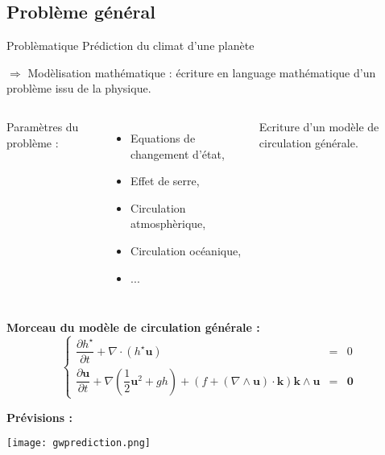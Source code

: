 \documentclass[11pt]{beamer}
\begin{document}
\subsection{Problème général}
\begin{frame}
\begin{block}{Problèmatique}
Prédiction du climat d'une planète

\begin{flushright}
$\Rightarrow$ Modèlisation mathématique : écriture en language mathématique d'un problème issu de la physique.
\end{flushright}

\pause
\end{block}

\vspace{0.8cm}
\begin{columns}
Paramètres du problème :
\begin{itemize}
\item Equations de changement d'état,
\item Effet de serre,
\item Circulation atmosphèrique,
\item Circulation océanique,
\item ...
\end{itemize}

\pause
{}
\begin{block}{}
Ecriture d'un modèle de circulation générale.
\end{block}
\end{columns}
\end{frame}

\begin{frame}
\textbf{Morceau du modèle de circulation générale :}
\begin{equation}
\left\lbrace
\begin{array}{rcl}
\dfrac{\partial h^{\star}}{\partial t} + \nabla \cdot \left( h^{\star} \mathbf{u} \right) & = & 0 \\
\dfrac{\partial \mathbf{u}}{\partial t} + \nabla \left( \dfrac{1}{2} \mathbf{u}^2 + g h \right) + \left(f  + \left( \nabla \wedge \mathbf{u} \right) \cdot \mathbf{k}\right) \mathbf{k} \wedge \mathbf{u} & = & \mathbf{0}
\end{array}
\right.
\end{equation}

\textbf{Prévisions :}

\begin{center}
\texttt{[image: gwprediction.png]}
\end{center}
\end{frame}
\end{document}
